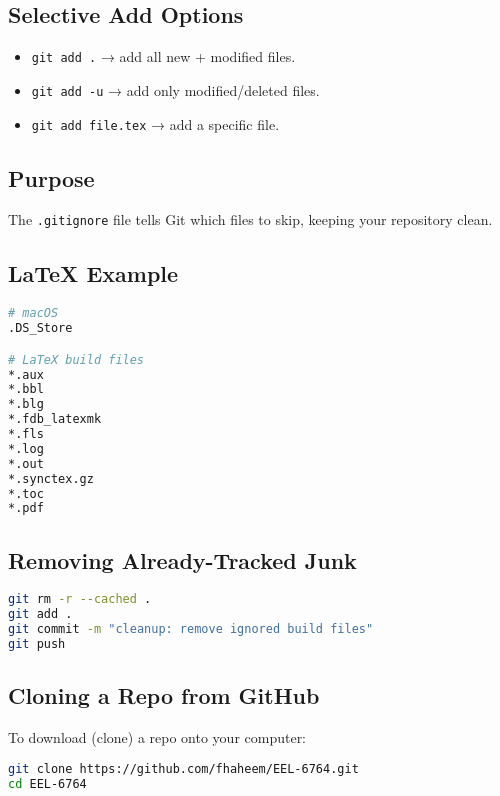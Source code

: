 \documentclass[11pt,letterpaper]{article}
\newcommand{\code}[1]{\textcolor{codeorange}{\texttt{#1}}}
\begin{document}
\subsection{Selective Add Options}
\begin{itemize}
    \item \code{git add .} → add all new + modified files.
    \item \code{git add -u} → add only modified/deleted files.
    \item \code{git add file.tex} → add a specific file.
\end{itemize}


\subsection{Purpose}
The \code{.gitignore} file tells Git which files to skip, keeping your repository clean.

\subsection{LaTeX Example}
\begin{lstlisting}[language=bash]
# macOS
.DS_Store

# LaTeX build files
*.aux
*.bbl
*.blg
*.fdb_latexmk
*.fls
*.log
*.out
*.synctex.gz
*.toc
*.pdf
\end{lstlisting}

\subsection{Removing Already-Tracked Junk}
\begin{lstlisting}[language=bash]
git rm -r --cached .
git add .
git commit -m "cleanup: remove ignored build files"
git push
\end{lstlisting}


\subsection{Cloning a Repo from GitHub}
To download (clone) a repo onto your computer:
\begin{lstlisting}[language=bash]
git clone https://github.com/fhaheem/EEL-6764.git
cd EEL-6764
\end{lstlisting}
\end{document}
